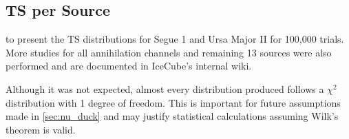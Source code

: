 \subsection{TS per Source} \label{sec:icDM_TSperSrc}

 to  present the TS distributions for Segue 1 and Ursa Major II for 100,000 trials.
More studies for all annihilation channels and remaining 13 sources were also performed and are documented in IceCube's internal wiki.

Although it was not expected, almost every distribution produced follows a $\chi^2$ distribution with 1 degree of freedom.
This is important for future assumptions made in \cref{sec:nu_duck} and may justify statistical calculations assuming Wilk's theorem is valid.

